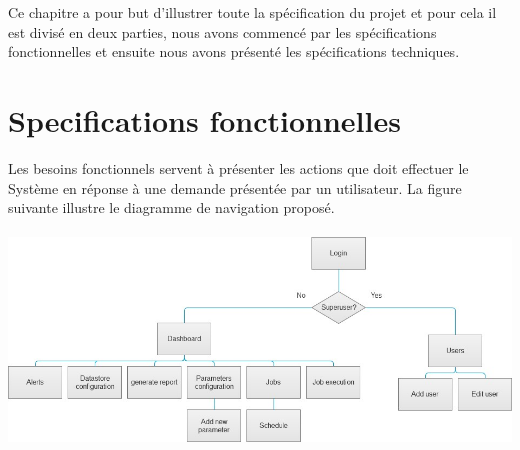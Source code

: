 \documentclass[oneside]{book}
\begin{document}
Ce chapitre a pour but d'illustrer toute la spécification du projet et pour cela il est divisé en deux parties, nous avons commencé par les spécifications fonctionnelles et ensuite nous avons présenté les spécifications techniques.

\section{Specifications fonctionnelles} 

Les besoins fonctionnels servent à présenter les actions que doit effectuer le
Système en réponse à une demande présentée par un utilisateur. La figure suivante illustre le diagramme de navigation proposé.
\\
\\
\includegraphics[width=\textwidth]{img/pages.jpg}\\
\\
\end{document}
